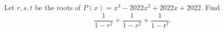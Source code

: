 Let $r,s,t$ be the roots of $P(x)=x^3-2022x^2+2022x+2022$. Find
\[\dfrac{1}{1-r^2}+\dfrac{1}{1-s^2}+\dfrac{1}{1-t^2}.\]
